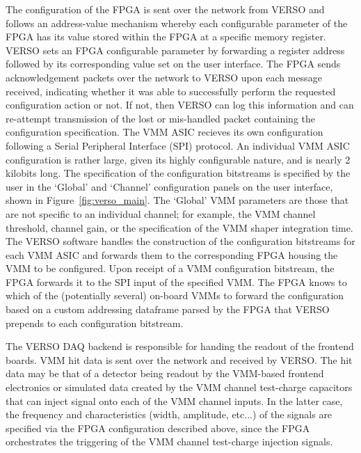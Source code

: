 \noindent The configuration of the FPGA is sent over the network from VERSO and
follows an address-value mechanism whereby each configurable parameter of the FPGA has its
value stored within the FPGA at a specific memory register.
VERSO sets an FPGA configurable parameter by forwarding a register address followed by its corresponding
value set on the user interface.
The FPGA sends acknowledgement packets over the network to VERSO upon each message received,
indicating whether it was able to successfully perform the requested configuration action or not.
If not, then VERSO can log this information and can re-attempt transmission of the lost or mis-handled packet
containing the configuration specification.
The VMM ASIC recieves its own configuration following a Serial Peripheral Interface (SPI) protocol.
An individual VMM ASIC configuration is rather large, given its highly configurable nature, and is
nearly 2 kilobits long.
The specification of the configuration bitstreams is specified by the user in the `Global' and `Channel' configuration
panels on the user interface, shown in Figure~\ref{fig:verso_main}.
The `Global' VMM parameters are those that are not specific to an individual channel; for example,
the VMM channel threshold, channel gain, or the specification of the VMM shaper integration time.
The VERSO software handles the construction of the configuration bitstreams for each VMM ASIC and forwards
them to the corresponding FPGA housing the VMM to be configured.
Upon receipt of a VMM configuration bitstream, the FPGA forwards it to the SPI input of the specified VMM.
The FPGA knows to which of the (potentially several) on-board VMMs to forward the configuration based on
a custom addressing dataframe parsed by the FPGA that VERSO prepends to each configuration bitstream.

The VERSO DAQ backend is responsible for handing the readout of the frontend boards.
VMM hit data is sent over the network and received by VERSO.
The hit data may be that of a detector being readout by the VMM-based frontend electronics
or simulated data created by the VMM channel test-charge capacitors that can inject
signal onto each of the VMM channel inputs.
In the latter case, the frequency and characteristics (width, amplitude, etc...) of the
signals are specified via the FPGA configuration described above, since the FPGA orchestrates
the triggering of the VMM channel test-charge injection signals.

